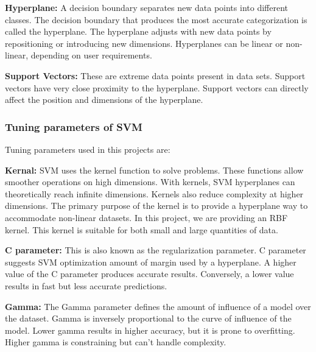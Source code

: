 \vspace{-1em}
\textbf{Hyperplane:} A decision boundary separates new data points into different classes. The
decision boundary that produces the most accurate categorization is called the hyperplane. The
hyperplane adjusts with new data points by repositioning or introducing new dimensions.
Hyperplanes can be linear or non-linear, depending on user requirements.
 
\vspace{-1em}
\textbf{Support Vectors:} These are extreme data points present in data sets. Support vectors
have very close proximity to the hyperplane. Support vectors can directly affect the position
and dimensions of the hyperplane.

\subsubsection{Tuning parameters of SVM}
\vspace{-0.5em}
Tuning parameters used in this projects are:

\vspace{-1em}
\textbf{Kernal:} SVM uses the kernel function to solve problems. These functions allow smoother
operations on high dimensions. With kernels, SVM hyperplanes can theoretically reach infinite
dimensions. Kernels also reduce complexity at higher dimensions. The primary purpose of the
kernel is to provide a hyperplane way to accommodate non-linear datasets. In this project, we
are providing an RBF kernel. This kernel is suitable for both small and large quantities of
data.

\vspace{-1em}
\textbf{C parameter:} This is also known as the regularization parameter. C parameter suggests
SVM optimization amount of margin used by a hyperplane. A higher value of the C parameter 
produces accurate results. Conversely, a lower value results in fast but less accurate
predictions.

\vspace{-1em}
\textbf{Gamma:} The Gamma parameter defines the amount of influence of a model over the
dataset. Gamma is inversely proportional to the curve of influence of the model. Lower gamma
results in higher accuracy, but it is prone to overfitting. Higher gamma is constraining but
can't handle complexity.

